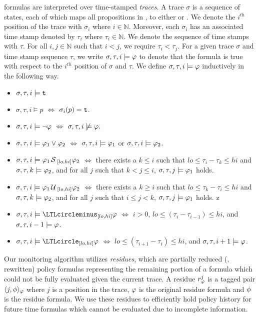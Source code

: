 \planguage formulas are interpreted over time-stamped \emph{traces}. A trace $\sigma$ is a sequence of states, each of which maps all propositions in \cP, to either \true or \false. We denote the $i^{th}$ position of the trace with $\sigma_i$ where $i\in\mathbb{N}$. Moreover, each $\sigma_i$ has an associated time stamp denoted by $\tau_i$ where $\tau_i\in\mathbb{N}$. 
We denote the sequence of time stamps with $\tau$. For all $i, j\in\mathbb{N}$ such that $i < j$, we require $\tau_i < \tau_j$. For a given trace $\sigma$ and time stamp sequence $\tau$, we write $\sigma, \tau, i\models\varphi$ to denote that the formula \policy is true with respect to the $i^{th}$ position of $\sigma$ and $\tau$. We define $\sigma, \tau, i\models\varphi$  inductively in the following way. 
\begin{itemize}
 \item $\sigma, \tau, i\models\mathrm{\texttt{t}}$
 \item $\sigma, \tau, i\models p$ $\Longleftrightarrow$ $\sigma_i(p) = \mathrm{\texttt{t}}$. 
 \item $\sigma, \tau, i\models\neg\varphi$ $\Longleftrightarrow$ $\sigma, \tau, i \not\models\varphi$. 
 \item $\sigma, \tau, i\models\varphi_1\vee\varphi_2$ $\Longleftrightarrow$ $\sigma, \tau, i\models\varphi_1$ or $\sigma, \tau, i\models\varphi_2$. 
 \item $\sigma, \tau, i\models\varphi_1\,\mathrm{\cal S}\,_{[lo, hi]}\varphi_2$ $\Longleftrightarrow$ there exists a $k\leq i$ such that $lo\leq\tau_i-\tau_k\leq hi$ and $\sigma, \tau, k\models\varphi_2$, and for all $j$ such that $k< j\leq i$, $\sigma, \tau, j\models\varphi_1$ holds. 
 \item $\sigma, \tau, i\models\varphi_1\,\mathrm{\cal U}\,_{[lo, hi]}\varphi_2$ $\Longleftrightarrow$ there exists a $k\geq i$ such that $lo\leq\tau_k-\tau_i\leq hi$ and $\sigma, \tau, k\models\varphi_2$, and for all $j$ such that $i\leq j< k$, $\sigma, \tau, j\models\varphi_1$ holds.
 z
 \item $\sigma, \tau, i\models\yesterday_{[lo, hi]}\policy$ $\Longleftrightarrow$ $i > 0$, $lo \leq (\tau_i-\tau_{i-1})\leq hi$, and $\sigma, \tau, i-1\models\varphi$.
 \item $\sigma, \tau, i\models\tomorrow_{[lo, hi]}\policy$ $\Longleftrightarrow$ $lo \leq (\tau_{i+1}-\tau_{i})\leq hi$, and $\sigma, \tau, i+1\models\varphi$. 
\end{itemize}


Our monitoring algorithm utilizes \emph{residues}, which are partially reduced (\ie, rewritten) policy formulas representing the remaining portion of a formula which could not be fully evaluated given the current trace. A residue $r^j_{\varphi}$ is a tagged pair $\langle j, \phi \rangle_{\varphi}$ where $j$ is a position in the trace, $\varphi$ is the original residue formula and $\phi$ is the residue formula. We use these residues to efficiently hold policy history for future time formulas which cannot be evaluated due to incomplete information.

